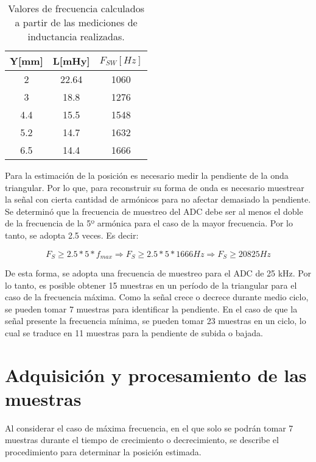 \begin{table}[H]
	\begin{center}
		\begin{tabular}{| c | c | c |}
			\hline
			Y[mm] & L[mHy] & $F_{SW}[Hz]$\\ \hline
			2 & 22.64 & 1060\\ \hline
			3 & 18.8 & 1276\\ \hline
			4.4 & 15.5 & 1548\\ \hline
			5.2 & 14.7 & 1632\\ \hline		
			6.5 & 14.4 & 1666\\ \hline
		\end{tabular}
		\caption{Valores de frecuencia calculados a partir de las mediciones de inductancia realizadas.}
		\label{frecuencias-calculadas}
	\end{center}
\end{table}


\noindent Para la estimación de la posición es necesario medir la pendiente de la onda triangular. Por lo que, para reconstruir su forma de onda es necesario muestrear la señal con cierta cantidad de armónicos para no afectar demasiado la pendiente. Se determinó que la frecuencia de muestreo del ADC debe ser al menos el doble de la frecuencia de la 5º armónica para el caso de la mayor frecuencia. Por lo tanto, se adopta 2.5 veces. Es decir:


\begin{equation} 
	F_S \geq 2.5 * 5 * f_{max} \Rightarrow  F_S \geq 2.5 * 5 * 1666 Hz \Rightarrow F_S \geq 20825 Hz
\end{equation}

\noindent De esta forma, se adopta una frecuencia de muestreo para el ADC de  25 kHz. Por lo tanto, es posible obtener 15 muestras en un período de la triangular para el caso de la frecuencia máxima. Como la señal crece o decrece durante medio ciclo, se pueden tomar 7 muestras para identificar la pendiente. En el caso de que la señal presente la frecuencia mínima, se pueden tomar 23 muestras en un ciclo, lo cual se traduce en 11 muestras para la pendiente de subida o bajada. 


\section{Adquisición y procesamiento de las muestras}

\noindent Al considerar el caso de máxima frecuencia, en el que solo se podrán tomar 7 muestras durante el tiempo de crecimiento o decrecimiento, se describe el procedimiento para determinar la posición estimada.


